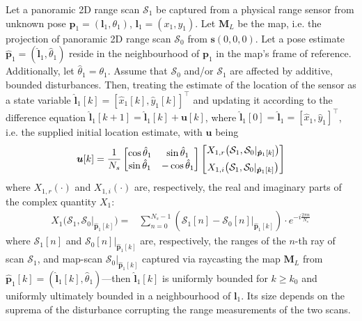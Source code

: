 \begin{theorem}
  \label{prop:theorem_without_disturbance}
  Let a panoramic 2D range scan $\mathcal{S}_1$ be captured from a physical
  range sensor from unknown pose $\bm{p}_1 = (\bm{l}_1,\theta_1)$, $\bm{l}_1 = (x_1,y_1)$.
  Let $\bm{M}_L$ be the map, i.e. the projection of panoramic 2D range scan
  $\mathcal{S}_0$ from $\bm{s}(0,0,0)$. Let a
  pose estimate $\hat{\bm{p}}_1 = (\hat{\bm{l}}_1, \hat{\theta}_1)$ reside in the
  neighbourhood of $\bm{p}_1$ in the map's frame of reference. Additionally, let
  $\hat{\theta}_1 = \theta_1$. Assume that $\mathcal{S}_0$ and/or $\mathcal{S}_1$
  are affected by additive, bounded disturbances. Then,
  treating the estimate of the location of the sensor as a state variable
  $\hat{\bm{l}}_1[k] = [\hat{x}_1[k], \hat{y}_1[k]]^\top$ and updating it according
  to the difference equation $\hat{\bm{l}}_1[k+1] = \hat{\bm{l}}_1[k] + \bm{u}[k]$,
  where $\hat{\bm{l}}_1[0] = \hat{\bm{l}}_1 = [\hat{x}_1, \hat{y}_1]^{\top}$,
  i.e. the supplied initial location estimate, with $\bm{u}$ being
  \begin{align}
    \bm{u}[k] = \dfrac{1}{N_s}
    \begin{bmatrix}
      \cos\hat{\theta}_1 & \sin\hat{\theta}_1 \\
      \sin\hat{\theta}_1 & - \cos\hat{\theta}_1
    \end{bmatrix}
    \begin{bmatrix}
      X_{1,r}\big(\mathcal{S}_1, \mathcal{S}_0|_{\bm{\hat{p}}_1[k]}\big) \vspace{0.2cm} \\
      X_{1,i}\big(\mathcal{S}_1, \mathcal{S}_0|_{\bm{\hat{p}}_1[k]}\big)
    \end{bmatrix}
    \label{eq:control_vector_without_disturbance}
  \end{align}
  where $X_{1,r}(\cdot)$ and $X_{1,i}(\cdot)$ are, respectively, the real and
  imaginary parts of the complex quantity $X_1$:
  \begin{align}
    X_1\big(\mathcal{S}_1, \mathcal{S}_0|_{\bm{\hat{p}}_1[k]}\big)
      = &\sum\limits_{n=0}^{N_s-1}(\mathcal{S}_1[n] - \mathcal{S}_0[n]|_{\bm{\hat{p}}_1[k]}) \cdot e^{-i \frac{2 \pi n}{N_s}} \label{eq:X1}
  \end{align}
  where $\mathcal{S}_1[n]$ and $\mathcal{S}_0[n]|_{\bm{\hat{p}}_1[k]}$ are,
  respectively, the ranges of the $n$-th ray of scan $\mathcal{S}_1$, and
  map-scan $\mathcal{S}_0|_{\bm{\hat{p}}_1[k]}$ captured via raycasting the map
  $\bm{M}_L$ from $\bm{\hat{p}}_1[k] = (\hat{\bm{l}}_1[k],
  \hat{\theta}_1)$---then $\hat{\bm{l}}_1[k]$ is uniformly bounded for $k \geq
  k_0$ and uniformly ultimately bounded in a neighbourhood of $\bm{l}_1$. Its
  size depends on the suprema of the disturbance corrupting the range
  measurements of the two scans.
\end{theorem}


